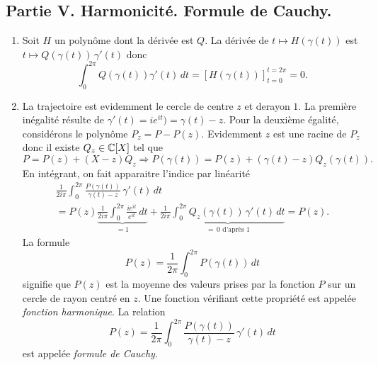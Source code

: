 \subsection*{Partie V. Harmonicité. Formule de Cauchy.}
\begin{enumerate}
 \item Soit $H$ un polynôme dont la dérivée est $Q$.\newline
 La dérivée de $t\mapsto H(\gamma(t))$ est $t\mapsto Q(\gamma(t))\,\gamma'(t)$ donc
\[
 \int_{0}^{2\pi}Q(\gamma(t))\gamma'(t)\,dt = \left[ H(\gamma(t))\right]_{t=0}^{t=2\pi} = 0.
\]

 \item La trajectoire est evidemment le cercle de centre $z$ et derayon $1$. La première inégalité résulte de $\gamma'(t) = ie^{it} ) = \gamma(t) -z$.\newline
 Pour la deuxième égalité, considérons le polynôme $P_z = P - P(z)$. Evidemment $z$ est une racine de $P_z$ donc il existe $Q_z \in \mathbb{C}[X]$ tel que 
\[
 P = P(z) + (X-z)Q_z \Rightarrow P(\gamma(t)) = P(z) + (\gamma(t)-z)Q_z(\gamma(t)).
\]
En intégrant, on fait apparaitre l'indice par linéarité
\begin{multline*}
 \frac{1}{2i\pi}\int_0^{2\pi}\frac{P(\gamma(t))}{\gamma(t) - z}\,\gamma'(t)\,dt \\
 = P(z) \underset{= 1}{\underbrace{\frac{1}{2i\pi} \int_0^{2\pi} \frac{ie^{it}}{e^{it}}\,dt}} 
 + \frac{1}{2i\pi}\underset{ =\, 0 \text{ d'après 1}}{\underbrace{\int_0^{2\pi} Q_z(\gamma(t))\,\gamma'(t)\,dt}} = P(z).
\end{multline*}
La formule 
\[
 P(z) = \frac{1}{2\pi}\int_0^{2\pi}P(\gamma(t))\, dt
\]
signifie que $P(z)$ est la moyenne des valeurs prises par la fonction $P$ sur un cercle de rayon centré en $z$. Une fonction vérifiant cette propriété est appelée \emph{fonction harmonique}.\newline
La relation 
\[
 P(z) = \frac{1}{2\pi}\int_0^{2\pi}\frac{P(\gamma(t))}{\gamma(t) - z}\, \gamma'(t)\, dt
\]
est appelée \emph{formule de Cauchy}.
\end{enumerate}
